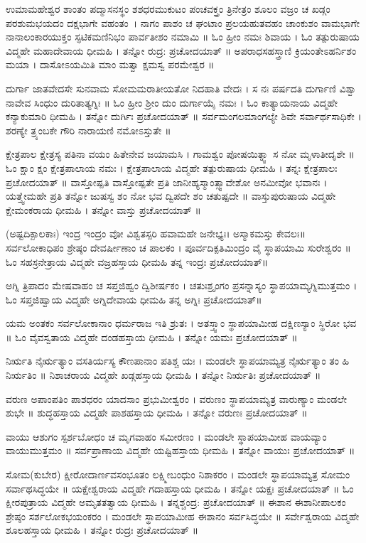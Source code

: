 ಉಮಾಮಹೇಶ್ವರ
ಶಾಂತಂ ಪದ್ಮಾಸನಸ್ಥಂ ಶಶಧರಮುಕುಟಂ ಪಂಚವಕ್ತ್ರಂ ತ್ರಿನೇತ್ರಂ
ಶೂಲಂ ವಜ್ರಂ ಚ ಖಡ್ಗಂ ಪರಶುಮಭಯದಂ ದಕ್ಷಭಾಗೇ ವಹಂತಂ~।
ನಾಗಂ ಪಾಶಂ ಚ ಘಂಟಾಂ ಪ್ರಲಯಹುತವಹಂ ಚಾಂಕುಶಂ ವಾಮಭಾಗೇ
ನಾನಾಲಂಕಾರಯುಕ್ತಂ ಸ್ಫಟಿಕಮಣಿನಿಭಂ ಪಾರ್ವತೀಶಂ ನಮಾಮಿ ॥
ಓಂ ಹ್ರೀಂ ನಮಃ ಶಿವಾಯ ।
ಓಂ ತತ್ಪುರುಷಾಯ ವಿದ್ಮಹೇ ಮಹಾದೇವಾಯ ಧೀಮಹಿ । ತನ್ನೋ ರುದ್ರ: ಪ್ರಚೋದಯಾತ್ ॥
ಅಪರಾಧಸಹಸ್ತ್ರಾಣಿ ಕ್ರಿಯಂತೇಽಹರ್ನಿಶಂ ಮಯಾ । ದಾಸೋಽಯಮಿತಿ ಮಾಂ ಮತ್ವಾ ಕ್ಷಮಸ್ವ ಪರಮೇಶ್ವರ ॥

ದುರ್ಗಾ
ಜಾತವೇದಸೇ ಸುನವಾಮ ಸೋಮಮರಾತೀಯತೋ ನಿದಹಾತಿ ವೇದಃ । ಸ ನಃ ಪರ್ಷದತಿ ದುರ್ಗಾಣಿ ವಿಶ್ವಾ ನಾವೇವ ಸಿಂಧುಂ ದುರಿತಾತ್ಯಗ್ನಿಃ ॥
ಓಂ ಹ್ರೀಂ ಶ್ರೀಂ ದುಂ ದುರ್ಗಾಯೈ ನಮಃ ।
ಓಂ ಕಾತ್ಯಾಯನಾಯ ವಿದ್ಮಹೇ ಕನ್ಯಾಕುಮಾರಿ ಧೀಮಹಿ । ತನ್ನೋ ದುರ್ಗಿಃ ಪ್ರಚೋದಯಾತ್ ॥
ಸರ್ವಮಂಗಲಮಾಂಗಲ್ಯೇ ಶಿವೇ ಸರ್ವಾರ್ಥಸಾಧಿಕೇ । ಶರಣ್ಯೇ ತ್ರ್ಯಂಬಕೇ ಗೌರಿ ನಾರಾಯಣಿ ನಮೋಽಸ್ತುತೇ ॥

ಕ್ಷೇತ್ರಪಾಲ
ಕ್ಷೇತ್ರಸ್ಯ ಪತಿನಾ ವಯಂ ಹಿತೇನೇವ ಜಯಾಮಸಿ । ಗಾಮಶ್ವಂ ಪೋಷಯಿತ್ನ್ವಾ ಸ ನೋ ಮೃಳಾತೀದೃಶೇ ॥
ಓಂ ಕ್ಷಾಂ ಕ್ಷಂ ಕ್ಷೇತ್ರಪಾಲಾಯ ನಮಃ ।
ಕ್ಷೇತ್ರಪಾಲಾಯ ವಿದ್ಮಹೇ ತತ್ಪುರುಷಾಯ ಧೀಮಹಿ । ತನ್ನಃ ಕ್ಷೇತ್ರಪಾಲಃ ಪ್ರಚೋದಯಾತ್ ॥
ವಾಸ್ತೋಷ್ಪತಿ
ವಾಸ್ತೋಷ್ಪತೇ ಪ್ರತಿ ಜಾನೀಹ್ಯಸ್ಮಾಂತ್ಸ್ವಾವೇಶೋ ಅನಮೀವೋ ಭವಾನಃ । ಯತ್ತ್ವೇಮಹೇ ಪ್ರತಿ ತನ್ನೋ ಜುಷಸ್ವ ಶಂ ನೋ ಭವ ದ್ವಿಪದೇ ಶಂ ಚತುಷ್ಪದೇ ॥
ವಾಸ್ತುಪುರುಷಾಯ ವಿದ್ಮಹೇ ಕ್ಷೇಮಂಕರಾಯ ಧೀಮಹಿ । ತನ್ನೋ ವಾಸ್ತು ಪ್ರಚೋದಯಾತ್ ॥

(ಅಷ್ಟದಿಕ್ಪಾಲಕಾಃ)
ಇಂದ್ರ
ಇಂದ್ರಂ ವೋ ವಿಶ್ವತಸ್ಪರಿ ಹವಾಮಹೇ ಜನೇಭ್ಯಃ। ಅಸ್ಮಾಕಮಸ್ತು ಕೇವಲಃ॥
 ಸರ್ವಲೋಕಾಧಿಪಂ ಶ್ರೇಷ್ಠಂ ದೇವರ್ಷೀಣಾಂ ಚ ಪಾಲಕಂ । ಪೂರ್ವದಿಕ್ಪತಿಮಿಂದ್ರಂ ವೈ ಸ್ಥಾಪಯಾಮಿ ಸುರೇಶ್ವರಂ ॥
ಓಂ ಸಹಸ್ರನೇತ್ರಾಯ ವಿದ್ಮಹೇ ವಜ್ರಹಸ್ತಾಯ ಧೀಮಹಿ ತನ್ನ ಇಂದ್ರಃ ಪ್ರಚೋದಯಾತ್॥

ಅಗ್ನಿ
ತ್ರಿಪಾದಂ ಮೇಷವಾಹಂ ಚ ಸಪ್ತಜಿಹ್ವಂ ದ್ವಿಶೀರ್ಷಕಂ । ಚತುಃಶ್ರೃಂಗಂ ಪ್ರಸನ್ನಾಸ್ಯಂ ಸ್ಥಾಪಯಾಮ್ಯಗ್ನಿಮುತ್ತಮಂ ।
ಓಂ ಸಪ್ತಜಿಹ್ವಾಯ ವಿದ್ಮಹೇ ಅಗ್ನಿದೇವಾಯ ಧೀಮಹಿ ತನ್ನ ಅಗ್ನಿಃ ಪ್ರಚೋದಯಾತ್॥

ಯಮ
ಅಂತಕಂ ಸರ್ವಲೋಕಾನಾಂ ಧರ್ಮರಾಜ ಇತಿ ಶ್ರುತಃ । ಅತಸ್ತ್ವಾಂ ಸ್ಥಾಪಯಾಮೀಹ ದಕ್ಷಿಣಸ್ಯಾಂ ಸ್ಥಿರೋ ಭವ ॥
ಓಂ ವೈವಸ್ವತಾಯ ವಿದ್ಮಹೇ ದಂಡಹಸ್ತಾಯ ಧೀಮಹಿ । ತನ್ನೋ ಯಮಃ ಪ್ರಚೋದಯಾತ್ ॥

ನಿರ್ಋತಿ
ನೈರ್ಋತ್ಯಾಂ ವಸತಿರ್ಯಸ್ಯ ಕೌಣಪಾನಾಂ ಪತಿಶ್ಚ ಯಃ । ಮಂಡಲೇ ಸ್ಥಾಪಯಾಮ್ಯತ್ರ ನೈರ್ಋತ್ಯಾಂ ತಂ ಹಿ ನಿರ್ಋತಿಂ ॥
ನಿಶಾಚರಾಯ ವಿದ್ಮಹೇ ಖಡ್ಗಹಸ್ತಾಯ ಧೀಮಹಿ । ತನ್ನೋ ನಿರ್ಋತಿಃ ಪ್ರಚೋದಯಾತ್ ॥

ವರುಣ
ಅಪಾಂಪತಿಂ
ಪಾಶಧರಂ ಯಾದಸಾಂ ಪ್ರಭುಮೀಶ್ವರಂ । ವರುಣಂ ಸ್ಥಾಪಯಾಮ್ಯತ್ರ ವಾರುಣ್ಯಾಂ ಮಂಡಲೇ ಶುಭೇ ॥
ಶುದ್ಧಹಸ್ತಾಯ ವಿದ್ಮಹೇ ಪಾಶಹಸ್ತಾಯ ಧೀಮಹಿ । ತನ್ನೋ ವರುಣಃ ಪ್ರಚೋದಯಾತ್ ॥

ವಾಯು
ಆಶುಗಂ ಸ್ಪರ್ಶಬೋಧಂ ಚ ಮೃಗವಾಹಂ ಸಮೀರಣಂ । ಮಂಡಲೇ ಸ್ಥಾಪಯಾಮೀಹ ವಾಯವ್ಯಾಂ ವಾಯುಮುತ್ತಮಂ ॥
ಸರ್ವಪ್ರಾಣಾಯ ವಿದ್ಮಹೇ ಯಷ್ಟಿಹಸ್ತಾಯ ಧೀಮಹಿ । ತನ್ನೋ ವಾಯುಃ ಪ್ರಚೋದಯಾತ್ ॥

ಸೋಮ(ಕುಬೇರ)
ಕ್ಷೀರೋದಾರ್ಣವಸಂಭೂತಂ ಲಕ್ಷ್ಮೀಬಂಧುಂ ನಿಶಾಕರಂ । ಮಂಡಲೇ ಸ್ಥಾಪಯಾಮ್ಯತ್ರ ಸೋಮಂ ಸರ್ವಾಥಸಿದ್ಧಯೇ ॥
ಯಕ್ಷೇಶ್ವರಾಯ ವಿದ್ಮಹೇ ಗದಾಹಸ್ತಾಯ ಧೀಮಹಿ । ತನ್ನೋ ಯಕ್ಷಃ ಪ್ರಚೋದಯಾತ್ ॥
ಓಂ ಕ್ಷೀರಪುತ್ರಾಯ ವಿದ್ಮಹೇ ಅಮೃತತತ್ವಾಯ ಧೀಮಹಿ । ತನ್ನಶ್ಚಂದ್ರ: ಪ್ರಚೋದಯಾತ್ ॥
ಈಶಾನ
ಈಶಾನೀಪಾಲಕಂ ಶ್ರೇಷ್ಠಂ ಸರ್ಶಲೋಕಭಯಂಕರಂ । ಮಂಡಲೇ ಸ್ಥಾಪಯಾಮೀಹ ಈಶಾನಂ ಸರ್ವಸಿದ್ಧಯೇ ॥
ಸರ್ವೇಶ್ವರಾಯ ವಿದ್ಮಹೇ ಶೂಲಹಸ್ತಾಯ ಧೀಮಹಿ । ತನ್ನೋ ರುದ್ರಃ ಪ್ರಚೋದಯಾತ್ ॥

